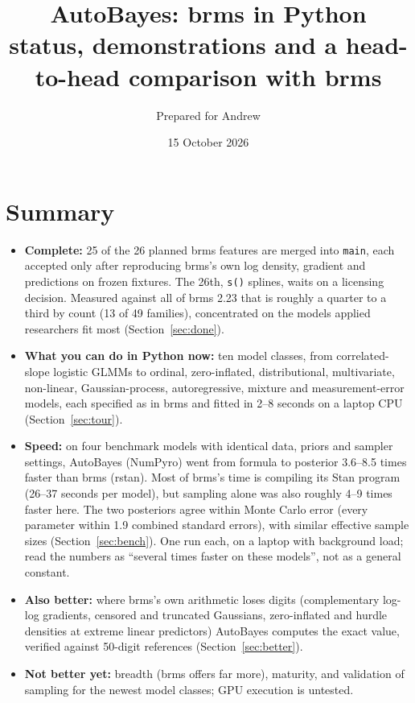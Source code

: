 \documentclass[11pt]{article}
\title{AutoBayes: brms in Python\\[2pt]\large status, demonstrations and a head-to-head comparison with brms}
\author{Prepared for Andrew}
\date{15 October 2026}
\newcommand{\code}[1]{\texttt{#1}}
\begin{document}
\maketitle

\section*{Summary}

\begin{itemize}
\item \textbf{Complete:} 25 of the 26 planned brms features are merged into \code{main}, each accepted only after
  reproducing brms's own log density, gradient and predictions on frozen fixtures. The 26th, \code{s()} splines, waits
  on a licensing decision. Measured against all of brms 2.23 that is roughly a quarter to a third by count (13 of 49
  families), concentrated on the models applied researchers fit most (Section~\ref{sec:done}).
\item \textbf{What you can do in Python now:} ten model classes, from correlated-slope logistic GLMMs to ordinal,
  zero-inflated, distributional, multivariate, non-linear, Gaussian-process, autoregressive, mixture and
  measurement-error models, each specified as in brms and fitted in 2--8 seconds on a laptop CPU (Section~\ref{sec:tour}).
\item \textbf{Speed:} on four benchmark models with identical data, priors and sampler settings, AutoBayes (NumPyro)
  went from formula to posterior 3.6--8.5 times faster than brms (rstan). Most of brms's time is compiling its Stan
  program (26--37 seconds per model), but sampling alone was also roughly 4--9 times faster here. The two posteriors
  agree within Monte Carlo error (every parameter within 1.9 combined standard errors), with similar effective sample
  sizes (Section~\ref{sec:bench}). One run each, on a laptop with background load; read the numbers as ``several times
  faster on these models'', not as a general constant.
\item \textbf{Also better:} where brms's own arithmetic loses digits (complementary log-log gradients, censored and
  truncated Gaussians, zero-inflated and hurdle densities at extreme linear predictors) AutoBayes computes the exact
  value, verified against 50-digit references (Section~\ref{sec:better}).
\item \textbf{Not better yet:} breadth (brms offers far more), maturity, and validation of sampling for the newest model
  classes; GPU execution is untested.
\end{itemize}
\end{document}
